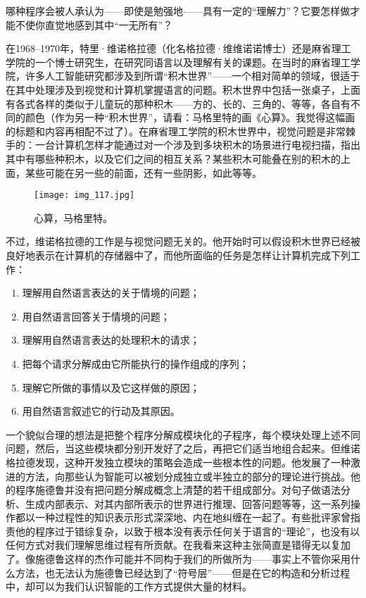 哪种程序会被人承认为——即使是勉强地——具有一定的“理解力”？它要怎样做才能不使你直觉地感到其中“一无所有”？

在1968--1970年，特里·维诺格拉德（化名格拉德·维维诺诺博士）还是麻省理工学院的一个博士研究生，在研究同语言以及理解有关的课题。在当时的麻省理工学院，许多人工智能研究都涉及到所谓“积木世界”——一个相对简单的领域，很适于在其中处理涉及到视觉和计算机掌握语言的问题。积木世界中包括一张桌子，上面有各式各样的类似于儿童玩的那种积木——方的、长的、三角的、等等，各自有不同的颜色（作为另一种“积木世界”，请看：马格里特的画《心算》。我觉得这幅画的标题和内容再相配不过了）。在麻省理工学院的积木世界中，视觉问题是非常棘手的：一台计算机怎样才能通过对一个涉及到多块积木的场景进行电视扫描，指出其中有哪些种积木，以及它们之间的相互关系？某些积木可能叠在别的积木的上面，某些可能在另一些的前面，还有一些阴影，如此等等。

\begin{figure}
\texttt{[image: img\_117.jpg]}
\caption[心算，马格里特作。]
  {心算，马格里特。}
\end{figure}

不过，维诺格拉德的工作是与视觉问题无关的。他开始时可以假设积木世界已经被良好地表示在计算机的存储器中了，而他所面临的任务是怎样让计算机完成下列工作：
\begin{enumerate}
\item 理解用自然语言表达的关于情境的问题；
\item 用自然语言回答关于情境的问题；
\item 理解用自然语言表达的处理积木的请求；
\item 把每个请求分解成由它所能执行的操作组成的序列；
\item 理解它所做的事情以及它这样做的原因；
\item 用自然语言叙述它的行动及其原因。
\end{enumerate}
一个貌似合理的想法是把整个程序分解成模块化的子程序，每个模块处理上述不同问题，然后，当这些模块都分别开发好了之后，再把它们适当地组合起来。但维诺格拉德发现，这种开发独立模块的策略会造成一些根本性的问题。他发展了一种激进的方法，向那些认为智能可以被划分成独立或半独立的部分的理论进行挑战。他的程序施德鲁并没有把问题分解成概念上清楚的若干组成部分。对句子做语法分析、生成内部表示、对其内部所表示的世界进行推理、回答问题等等，这一系列操作都以一种过程性的知识表示形式深深地、内在地纠缠在一起了。有些批评家曾指责他的程序过于错综复杂，以致于根本没有表示任何关于语言的“理论”，也没有以任何方式对我们理解思维过程有所贡献。在我看来这种主张简直是错得无以复加了。像施德鲁这样的杰作可能并不同构于我们的所做所为——事实上不管你采用什么方法，也无法认为施德鲁已经达到了“符号层”——但是在它的构造和分析过程中，却可以为我们认识智能的工作方式提供大量的材料。


